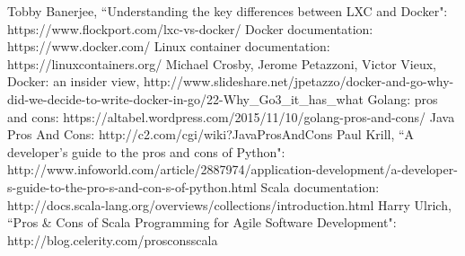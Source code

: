 \documentclass[letterpaper,twocolumn,10pt]{article}
\begin{document}
\begin{thebibliography}{1}
\bibitem{}
Tobby Banerjee, ``Understanding the key differences between LXC and Docker": https://www.flockport.com/lxc-vs-docker/
\bibitem{}
Docker documentation: https://www.docker.com/
\bibitem{}
Linux container documentation: https://linuxcontainers.org/
\bibitem{}
Michael Crosby, Jerome Petazzoni, Victor Vieux, Docker: an insider view, http://www.slideshare.net/jpetazzo/docker-and-go-why-did-we-decide-to-write-docker-in-go/22-Why\_Go3\_it\_has\_what
\bibitem{}
Golang: pros and cons: https://altabel.wordpress.com/2015/11/10/golang-pros-and-cons/
\bibitem{}
Java Pros And Cons: http://c2.com/cgi/wiki?JavaProsAndCons
\bibitem{}
 Paul Krill, ``A developer's guide to the pros and cons of Python": http://www.infoworld.com/article/2887974/application-development/a-developer-s-guide-to-the-pro-s-and-con-s-of-python.html
\bibitem{}
Scala documentation: http://docs.scala-lang.org/overviews/collections/introduction.html
\bibitem{}
Harry Ulrich, ``Pros \& Cons of Scala Programming for Agile Software Development": http://blog.celerity.com/pros\-cons\-scala


\end{thebibliography}
\end{document}
